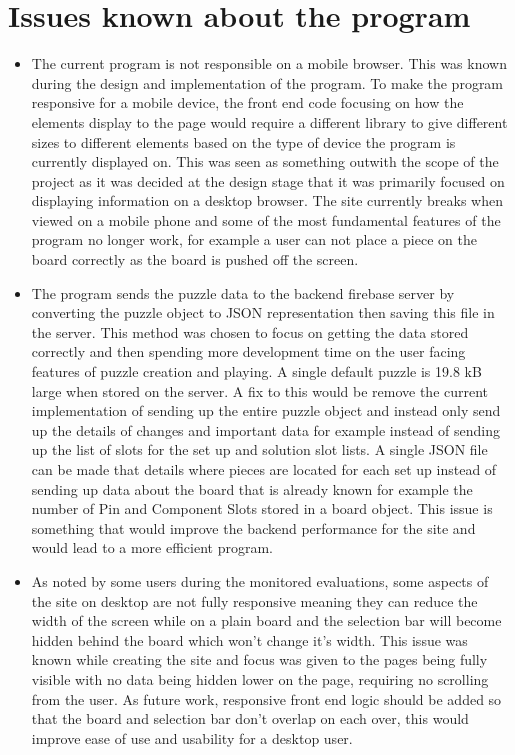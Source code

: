 \documentclass{l4proj}
\begin{document}
\section{Issues known about the program}
\begin{itemize}
    \item The current program is not responsible on a mobile browser. This was known during the design and implementation of the program. To make the program responsive for a mobile device, the front end code focusing on how the elements display to the page would require a different library to give different sizes to different elements based on the type of device the program is currently displayed on. This was seen as something outwith the scope of the project as it was decided at the design stage that it was primarily focused on displaying information on a desktop browser. The site currently breaks when viewed on a mobile phone and some of the most fundamental features of the program no longer work, for example a user can not place a piece on the board correctly as the board is pushed off the screen.
    \item The program sends the puzzle data to the backend firebase server by converting the puzzle object to JSON representation then saving this file in the server. This method was chosen to focus on getting the data stored correctly and then spending more development time on the user facing features of puzzle creation and playing. A single default puzzle is 19.8 kB large when stored on the server. A fix to this would be remove the current implementation of sending up the entire puzzle object and instead only send up the details of changes and important data for example instead of sending up the list of slots for the set up and solution slot lists. A single JSON file can be made that details where pieces are located for each set up instead of sending up data about the board that is already known for example the number of Pin and Component Slots stored in a board object. This issue is something that would improve the backend performance for the site and would lead to a more efficient program. 
    \item As noted by some users during the monitored evaluations, some aspects of the site on desktop are not fully responsive meaning they can reduce the width of the screen while on a plain board and the selection bar will become hidden behind the board which won't change it's width. This issue was known while creating the site and focus was given to the pages being fully visible with no data being hidden lower on the page, requiring no scrolling from the user. As future work, responsive front end logic should be added so that the board and selection bar don't overlap on each over, this would improve ease of use and usability for a desktop user.

\end{itemize}
\end{document}
